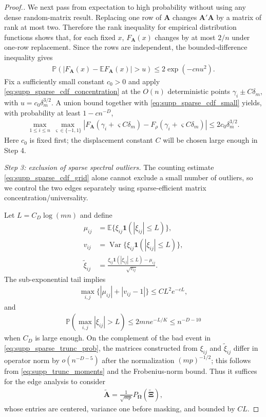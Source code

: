 \documentclass[numsec,webpdf,modern,large,namedate]{oup-authoring-template}
\theoremstyle{plain}
\theoremstyle{remark}
\newcommand{\bOmega}{\bm{\Omega}}
\newif\ifmarkchanges
\newenvironment{revision}{\begingroup\ifmarkchanges\color{red}\fi}{\endgroup}
\begin{document}
\begin{revision}
\begin{proof}[Proof.]
We next pass from expectation to high probability without using any dense
random-matrix result.  Replacing one row of $\bm A$ changes
$\bm A'\bm A$ by a matrix of rank at most two.  Therefore the rank
inequality for empirical distribution functions shows that, for each fixed
$x$, $F_{\bm A}(x)$ changes by at most $2/n$ under one-row replacement.
Since the rows are independent, the bounded-difference inequality gives
\begin{align}
\label{eq:supp_sparse_cdf_concentration}
    \mathbb P\left(
    |F_{\bm A}(x)-\mathbb E F_{\bm A}(x)|>u\right)
    \le2\exp(-cnu^2).
\end{align}
Fix a sufficiently small constant $c_0>0$ and apply
\eqref{eq:supp_sparse_cdf_concentration} at the $O(n)$ deterministic points
$\gamma_i\pm C\delta_m$, with
$u=c_0\delta_m^{3/2}$.  A union bound together with
\eqref{eq:supp_sparse_cdf_small} yields, with probability at least
$1-cn^{-D}$,
\begin{align}
\label{eq:supp_sparse_cdf_grid}
    \max_{1\le i\le n}
    \max_{\varsigma\in\{-1,1\}}
    \left|
    F_{\bm A}(\gamma_i+\varsigma C\delta_m)
    -F_\rho(\gamma_i+\varsigma C\delta_m)
    \right|
    \le2c_0\delta_m^{3/2}.
\end{align}
Here $c_0$ is fixed first; the displacement constant $C$ will be chosen
large enough in Step 4.

\textit{Step 3: exclusion of sparse spectral outliers.}
The counting estimate \eqref{eq:supp_sparse_cdf_grid} alone cannot exclude a
small number of outliers, so we control the two edges separately using
sparse-efficient matrix concentration/universality.

Let $L=C_D\log(mn)$ and define
\begin{align*}
    \mu_{ij}
    &=\mathbb E\{\xi_{ij}\mathbf1(|\xi_{ij}|\le L)\},\\
    v_{ij}
    &=\operatorname{Var}\{\xi_{ij}\mathbf1(|\xi_{ij}|\le L)\},\\
    \widetilde\xi_{ij}
    &=\frac{\xi_{ij}\mathbf1(|\xi_{ij}|\le L)-\mu_{ij}}
      {\sqrt{v_{ij}}}.
\end{align*}
The sub-exponential tail implies
\begin{align}
\label{eq:supp_trunc_moments}
    \max_{i,j}\{|\mu_{ij}|+|v_{ij}-1|\}
    \le C L^2e^{-cL},
\end{align}
and
\begin{align}
\label{eq:supp_sparse_trunc_prob}
    \mathbb P\left(\max_{i,j}|\xi_{ij}|>L\right)
    \le2mn e^{-L/K}\le n^{-D-10}
\end{align}
when $C_D$ is large enough.  On the complement of the bad event in
\eqref{eq:supp_sparse_trunc_prob}, the matrices constructed from
$\xi_{ij}$ and $\widetilde\xi_{ij}$ differ in operator norm by
$o(n^{-D-5})$ after the normalization $(mp)^{-1/2}$; this follows from
\eqref{eq:supp_trunc_moments} and the Frobenius-norm bound.  Thus it suffices
for the edge analysis to consider
\begin{align*}
    \widetilde{\bm A}
    =\frac{1}{\sqrt{mp}}P_{\bOmega}(\widetilde{\bm\Xi}),
\end{align*}
whose entries are centered, variance one before masking, and bounded by
$CL$.


\end{proof}
\end{revision}
\end{document}

